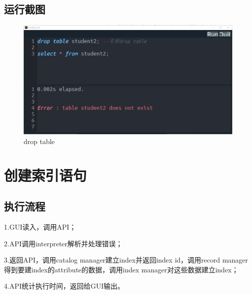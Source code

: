 \documentclass[UTF8]{ctexrep} %
\begin{document}
\subsection{运行截图}
\begin{figure}[H]
    \centering
    \includegraphics[width=0.8\linewidth]{figure/2.1.png}
    \caption{drop table}
    \label{fig:runtime2.1}
\end{figure}
\section{创建索引语句}
\subsection{执行流程}
1.GUI读入，调用API；
\par
2.API调用interpreter解析并处理错误；
\par
3.返回API，调用catalog manager建立index并返回index id，调用record manager得到要建index的attribute的数据，调用index manager对这些数据建立index；
\par
4.API统计执行时间，返回给GUI输出。
\end{document}
